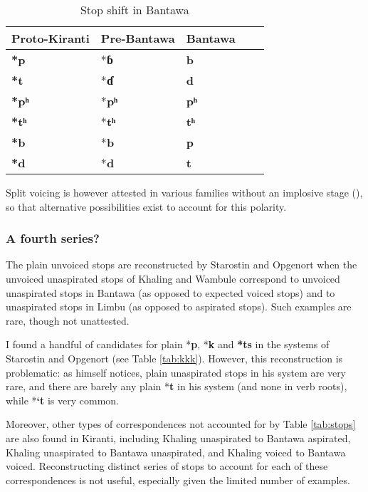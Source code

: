\documentclass[oneside,a4paper,11pt]{article}
\newcommand{\ipa}[1]{\textbf{{\phon\mbox{#1}}}} %
\begin{document}
 

\begin{table}[H]
\caption{Stop shift in Bantawa} \centering \label{tab:bantawa}
\begin{tabular}{lllll}
\toprule
Proto-Kiranti &  Pre-Bantawa &   Bantawa \\
\midrule
\ipa{*p} & *\ipa{ɓ} & \ipa{b} \\
\ipa{*t} & *\ipa{ɗ} & \ipa{d} \\
\ipa{*pʰ} & *\ipa{pʰ} &  \ipa{pʰ} \\
\ipa{*tʰ} & *\ipa{tʰ} & \ipa{tʰ} \\
\ipa{*b} & *\ipa{b} &  \ipa{p} \\
\ipa{*d} & *\ipa{d} & \ipa{t} \\
\bottomrule
\end{tabular}
\end{table}
 
 Split voicing is however attested in various families without an implosive stage (\citealt[49-51]{kuemmel07wandel}), so that alternative possibilities exist to account for this polarity.
 

\subsubsection{A fourth series?} \label{sec:fourth}
The plain unvoiced stops are reconstructed by Starostin and Opgenort  when the unvoiced unaspirated stops of Khaling and Wambule correspond to unvoiced unaspirated stops in Bantawa (as opposed to expected voiced stops) and to unaspirated stops in Limbu (as opposed to aspirated stops). Such examples are rare, though not unattested. 

I found a handful of candidates for plain *\ipa{p}, *\ipa{k} and \ipa{*ts} in the systems of Starostin and Opgenort (see Table \ref{tab:kkk}). However, this reconstruction is problematic: as \citet[17]{opgenort05jero} himself notices, plain unaspirated stops in his system are very rare, and there are barely any plain *\ipa{t} in his system (and none in verb roots), while *\ipa{`t} is very common.  

Moreover, other types of correspondences not accounted for by Table \ref{tab:stops} are also found in Kiranti, including Khaling  unaspirated to Bantawa aspirated, Khaling unaspirated to Bantawa unaspirated, and Khaling voiced to Bantawa voiced. Reconstructing distinct series of stops to account for each of these correspondences is not useful, especially given the limited number of examples. 
\end{document}
